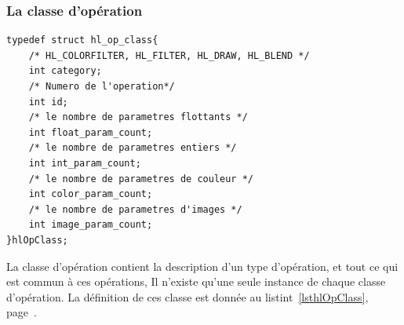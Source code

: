 		\subsubsection{La classe d'opération}
			\begin{lstlisting}[float,caption={Définition des classes d'opérations },frame=tb,label=lsthlOpClass]
typedef struct hl_op_class{
	/* HL_COLORFILTER, HL_FILTER, HL_DRAW, HL_BLEND */
	int category;
	/* Numero de l'operation*/
	int id;
	/* le nombre de parametres flottants */
	int float_param_count;
	/* le nombre de parametres entiers */
	int int_param_count;
	/* le nombre de parametres de couleur */
	int color_param_count;
	/* le nombre de parametres d'images */
	int image_param_count;
}hlOpClass;
			\end{lstlisting}
			La classe d'opération contient la description d'un type d'opération, et tout ce qui est commun à ces opérations, Il n'existe qu'une
			seule instance de chaque classe d'opération. La définition de ces classe est donnée au listint~\ref{lsthlOpClass}, page~\pageref{lsthlOpClass}.

